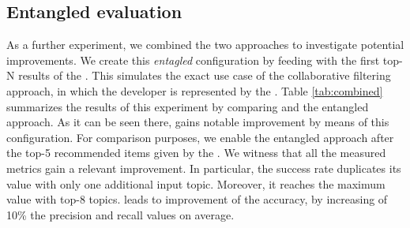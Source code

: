 %

\subsection{Entangled evaluation} \label{sec:EXP3}
\rqsecond

As a further experiment, we combined the two approaches to investigate potential improvements. We create this \emph{entagled} configuration by feeding \CT with the first top-N results of the \MNB. This simulates the exact use case of the collaborative filtering approach, in which the developer is represented by the \MNB. Table \ref{tab:combined} summarizes the results of this experiment by comparing \CT and the entangled approach. As it can be seen there, \CT gains notable improvement by means of this configuration. For comparison purposes, we enable the entangled approach after the top-5 recommended items given by the \MNB. We witness that all the measured metrics gain a relevant improvement. In particular, the success rate duplicates its value with only one additional input topic. Moreover, it reaches the maximum value with top-8 topics.  \CT leads to improvement of the \MNB accuracy, by increasing of 10\% the precision and recall values on average. 

